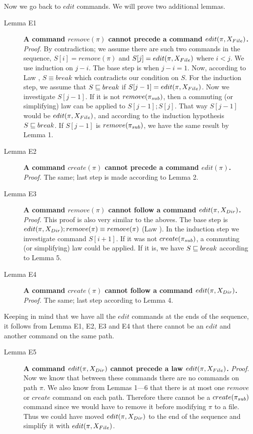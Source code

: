 Now we go back to \(edit\) commands. We will prove two additional lemmas.
\begin{description}
\item[Lemma E1] {\bf A command \(remove(\pi)\) cannot precede a command
\(edit(\pi,X_{File})\).} \emph{Proof.} 
By contradiction; we assume there are such two commands in the sequence,
\(S[i]=remove(\pi)\) and \(S[j]=edit(\pi,X_{File})\) where \(i<j\). We
use induction on \(j-i\). The base
step is when \(j-i=1\). Now, according to Law \lawxviii, \(S\equiv
break\) which contradicts our condition on \(S\).
For the induction step, we assume that \(S\sqsubseteq break\) if
\(S[j-1]=edit(\pi,X_{File})\). Now we investigate \(S[j-1]\). If it is
not \(remove(\pi_{sub})\), then a commuting (or simplifying) law can be
applied to \(S[j-1];S[j]\). That way
\(S[j-1]\) would be \(edit(\pi,X_{File})\), and according to the
induction hypothesis \(S\sqsubseteq break\). If \(S[j-1]\) is
\(remove(\pi_{sub})\), we have the same result by Lemma 1.

\item[Lemma E2] {\bf A command \(create(\pi)\) cannot precede a command 
\(edit(\pi)\).} 
\emph{Proof.} The same; last step is made according to
Lemma 2.

\item[Lemma E3] {\bf A command \(remove(\pi)\) cannot follow a
command \(edit(\pi,X_{Dir})\).} 
\emph{Proof.} 
This proof is also very similar to the aboves. The base step is 
\(edit(\pi,X_{Dir}); remove(\pi)\equiv remove(\pi)\) (Law \lawxxv). In the
induction step we investigate command \(S[i+1]\). If it was not
\(create(\pi_{sub})\), a commuting (or simplifying) law could be applied. If
it is, we have \(S\sqsubseteq break\) according to Lemma 5.

\item[Lemma E4] {\bf A command \(create(\pi)\) cannot follow a
command \(edit(\pi,X_{Dir})\).} 
\emph{Proof.} The same; last step
according to Lemma 4.
\end{description}

\noindent
Keeping in mind that we have all the \(edit\) commands at the ends of the
sequence, it follows from Lemma E1, E2, E3 and E4 that there cannot be an
\(edit\) and another command on the same path.

\begin{description}
\item[Lemma E5] {\bf A command \(edit(\pi,X_{Dir})\) cannot precede a law
\(edit(\pi,X_{File})\).} \emph{Proof.} Now we know that between these
commands there are no commands on path \(\pi\). We also know from Lemmas
1---6 that there is at most one \(remove\) or \(create\) command on each
path. Therefore
there cannot be a \(create(\pi_{sub})\) command since we would have to
remove it before modifying \(\pi\) to a file.
Thus we could have moved \(edit(\pi,X_{Dir})\) to the end of the sequence
and simplify it with \(edit(\pi,X_{File})\).
\end{description}

